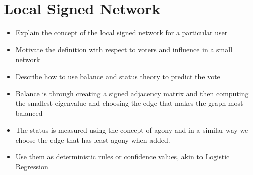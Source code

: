 \section{Local Signed Network}
\label{sec:local-signed-network}
\begin{itemize}
    \item Explain the concept of the local signed network for a particular user
    \item Motivate the definition with respect to voters and influence in a small network
    \item Describe how to use balance and status theory to predict the vote
    \item Balance is through creating a signed adjacency matrix and then computing the smallest eigenvalue and choosing the edge that makes the graph most balanced
    \item The status is measured using the concept of agony and in a similar way we choose the edge that has least agony when added.
    \item Use them as deterministic rules or confidence values, akin to Logistic Regression
\end{itemize}